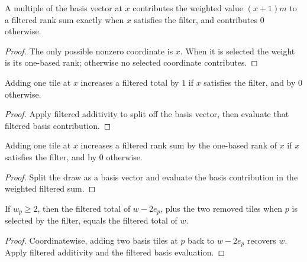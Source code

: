 \begin{lemma}

  \label{lem:filtered_rank_basis}
  A multiple of the basis vector at \(x\) contributes the weighted value
  \((x+1)m\) to a filtered rank sum exactly when \(x\) satisfies the
  filter, and contributes \(0\) otherwise.
\end{lemma}
\begin{proof}

\leanok
  The only possible nonzero coordinate is \(x\).  When it is selected the
  weight is its one-based rank; otherwise no selected coordinate
  contributes.
\end{proof}

\begin{lemma}

  \label{lem:filtered_total_add_basis}
  Adding one tile at \(x\) increases a filtered total by \(1\) if \(x\)
  satisfies the filter, and by \(0\) otherwise.
\end{lemma}
\begin{proof}

\leanok
  Apply filtered additivity to split off the basis vector, then evaluate
  that filtered basis contribution.
\end{proof}

\begin{lemma}

  \label{lem:filtered_rank_add_basis}
  Adding one tile at \(x\) increases a filtered rank sum by the
  one-based rank of \(x\) if \(x\) satisfies the filter, and by \(0\)
  otherwise.
\end{lemma}
\begin{proof}

\leanok
  Split the draw as a basis vector and evaluate the basis contribution in
  the weighted filtered sum.
\end{proof}

\begin{lemma}

  \label{lem:filtered_total_remove_pair_add_pair}
  If \(w_p\ge2\), then the filtered total of \(w-2e_p\), plus the two
  removed tiles when \(p\) is selected by the filter, equals the filtered
  total of \(w\).
\end{lemma}
\begin{proof}

\leanok
  Coordinatewise, adding two basis tiles at \(p\) back to \(w-2e_p\)
  recovers \(w\).  Apply filtered additivity and the filtered basis
  evaluation.
\end{proof}

